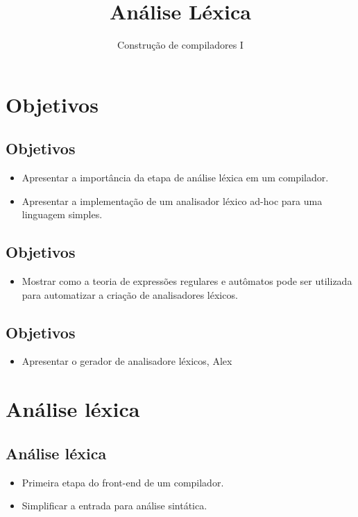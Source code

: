 \documentclass[11pt]{article}
\author{Construção de compiladores I}
\date{}
\title{Análise Léxica}
\begin{document}
\maketitle
\section*{Objetivos}
\label{sec:org3354a03}

\subsection*{Objetivos}
\label{sec:org3d29198}

\begin{itemize}
\item Apresentar a importância da etapa de análise léxica
em um compilador.
\item Apresentar a implementação de um analisador léxico ad-hoc
para uma linguagem simples.
\end{itemize}
\subsection*{Objetivos}
\label{sec:org7a982b1}

\begin{itemize}
\item Mostrar como a teoria de expressões regulares e autômatos pode ser utilizada para automatizar a criação de analisadores léxicos.
\end{itemize}
\subsection*{Objetivos}
\label{sec:org28a962b}

\begin{itemize}
\item Apresentar o gerador de analisadore léxicos, Alex
\end{itemize}
\section*{Análise léxica}
\label{sec:orge686e10}

\subsection*{Análise léxica}
\label{sec:org103ef9f}

\begin{itemize}
\item Primeira etapa do front-end de um compilador.
\item Simplificar a entrada para análise sintática.
\end{itemize}
\end{document}
